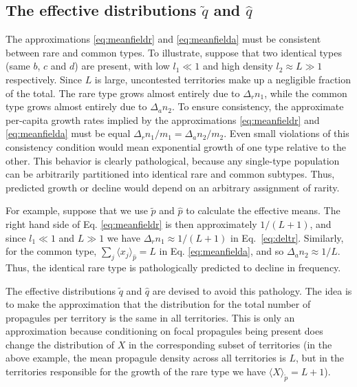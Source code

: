 \documentclass[12pt]{article}
\begin{document}
\subsection*{The effective distributions $\tilde{q}$ and $\hat{q}$}

The approximations \eqref{eq:meanfieldr} and \eqref{eq:meanfielda} must be consistent between rare and common types. To illustrate, suppose that two identical types (same $b$, $c$ and $d$) are present, with low $l_1\ll 1$ and high density $l_2\approx L\gg 1$ respectively. Since $L$ is large, uncontested territories make up a negligible fraction of the total. The rare type grows almost entirely due to $\Delta_r n_1$, while the common type grows almost entirely due to $\Delta_a n_2$. To ensure consistency, the approximate per-capita growth rates implied by the approximations \eqref{eq:meanfieldr} and \eqref{eq:meanfielda} must be equal $\Delta_r n_1/m_1 = \Delta_a n_2/m_2$. Even small violations of this consistency condition would mean exponential growth of one type relative to the other. This behavior is clearly pathological, because any single-type population can be arbitrarily partitioned into identical rare and common subtypes. Thus,   predicted growth or decline would depend on an arbitrary assignment of rarity.

For example, suppose that we use $\tilde{p}$ and $\hat{p}$ to calculate the effective means. The right hand side of Eq. \eqref{eq:meanfieldr} is then approximately $1/(L+1)$, and since $l_1\ll 1$ and $L\gg 1$ we have $\Delta_r n_1 \approx 1/(L+1)$ in Eq.~\eqref{eq:deltr}. Similarly, for the common type, $\sum_j \langle x_j\rangle_{\hat{p}} = L$ in Eq. \eqref{eq:meanfielda}, and so $\Delta_a n_2 \approx 1/L$. Thus, the identical rare type is  pathologically predicted to decline in frequency.

The effective distributions $\tilde{q}$ and $\hat{q}$ are devised to avoid this pathology. The idea is to make the approximation that the distribution for the total number of propagules per territory is the same in all territories. This is only an approximation because conditioning on focal propagules being present does change the distribution of $X$ in the corresponding subset of territories (in the above example, the mean propagule density across all territories is $L$, but in the territories responsible for the growth of the rare type we have $\langle X \rangle_{\tilde{p}}=L+1$). 
\end{document}
